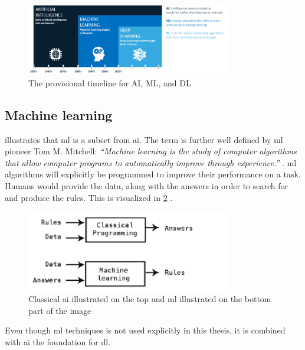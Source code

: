 \documentclass[USenglish]{ifimaster}  %
\begin{document}
\begin{figure}[ht]
    \centering
    \includegraphics[width=0.8\textwidth]{bilder/AI_ML_DL.png}
    \caption{The provisional timeline for AI, ML, and DL \cite{website:AI}}
    \label{fig:AI}
\end{figure}

\subsection{Machine learning}
 illustrates that \ac{ml} is a subset from \ac{ai}. The term is further well defined by \ac{ml} pioneer Tom M. Mitchell:
\newline
\newline
\textit{“Machine learning is the study of computer algorithms that allow computer programs to automatically improve through experience.”} \cite{tom_mitchell}.
\newline
\newline
\ac{ml} algorithms will explicitly be programmed to improve their performance on a task. Humans would provide the data, along with the answers in order to search for and produce the rules. This is visualized in \cref{fig:ml} \cite{Francois_Deep_learning_with_python}.
\begin{figure}[ht]
    \centering
    \includegraphics[width=0.8\textwidth]{bilder/ml.png}
    \caption{Classical \ac{ai} illustrated on the top and \ac{ml} illustrated on the bottom part of the image \cite{Francois_Deep_learning_with_python}}
    \label{fig:ml}
\end{figure}

Even though \ac{ml} techniques is not used explicitly in this thesis, it is combined with \ac{ai} the foundation for \ac{dl}.
\end{document}
